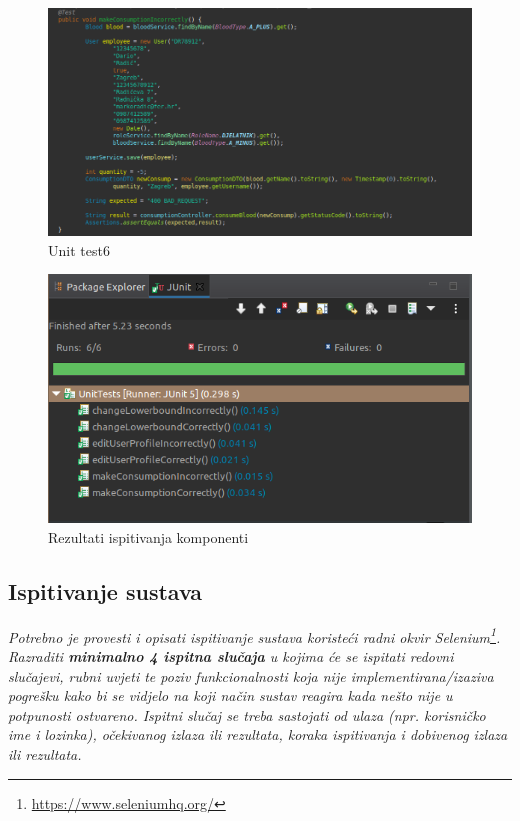 \begin{figure}[H]
	\centering
	\includegraphics[width=\textwidth, scale=0.5]{slike/unit6}
	\caption{Unit test6}
\end{figure}
\eject
\begin{figure}[H]
	\centering
	\includegraphics[width=\textwidth, scale=0.5]{slike/unit_testing}
	\caption{Rezultati ispitivanja komponenti}
\end{figure}

			
			\subsection{Ispitivanje sustava}
			
			 \textit{Potrebno je provesti i opisati ispitivanje sustava koristeći radni okvir Selenium\footnote{\url{https://www.seleniumhq.org/}}. Razraditi \textbf{minimalno 4 ispitna slučaja} u kojima će se ispitati redovni slučajevi, rubni uvjeti te poziv funkcionalnosti koja nije implementirana/izaziva pogrešku kako bi se vidjelo na koji način sustav reagira kada nešto nije u potpunosti ostvareno. Ispitni slučaj se treba sastojati od ulaza (npr. korisničko ime i lozinka), očekivanog izlaza ili rezultata, koraka ispitivanja i dobivenog izlaza ili rezultata.\\ }
			 
